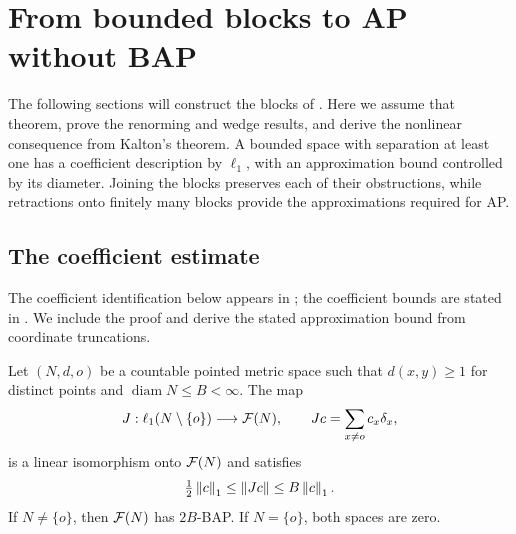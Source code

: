 \section{From bounded blocks to AP without BAP}\label{sec:reduction}

The following sections will construct the blocks of .
Here we assume that theorem, prove the renorming and wedge results, and
derive the nonlinear consequence from Kalton's theorem. A bounded space with separation at least one has a
coefficient description by $\ell_1$, with an approximation bound
controlled by its diameter.
Joining the blocks preserves each of their obstructions, while retractions
onto finitely many blocks provide the approximations required for AP.

\subsection{The coefficient estimate}

The coefficient identification below appears in
\cite[Theorem~4.14]{AACD20}; the coefficient bounds are stated in
\cite[Lemma~3.4]{CuthKalenda26}. We include the proof and derive the
stated approximation bound from coordinate truncations.

\begin{proposition}\label{prop:coefficients}
Let $(N,d,o)$ be a countable pointed metric space such that
$d(x,y)\ge1$ for distinct points and $\operatorname{diam}N\le B<\infty$.
The map
\[
 J:\ell_1(N\setminus\{o\})\longrightarrow\mathcal F(N),
 \qquad Jc=\sum_{x\ne o}c_x\delta_x,
\]
is a linear isomorphism onto $\mathcal F(N)$ and satisfies
\begin{equation}\label{eq:coefficient-bounds}
 \tfrac12\left\|c\right\|_1\le\left\|Jc\right\|\le B\left\|c\right\|_1.
\end{equation}
If $N\ne\{o\}$, then $\mathcal F(N)$ has $2B$-BAP. If $N=\{o\}$, both
spaces are zero.
\end{proposition}

